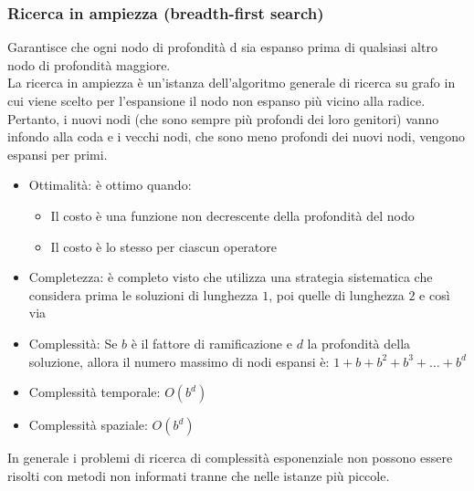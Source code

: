 \documentclass[../main.tex]{subfiles}
\begin{document}
	\subsubsection{Ricerca in ampiezza (breadth-first search)}
	Garantisce che ogni nodo di profondità d sia espanso prima di qualsiasi altro nodo di profondità maggiore.\\
	La ricerca in ampiezza è un'istanza dell'algoritmo generale di ricerca su grafo in cui viene scelto per l'espansione il nodo non espanso più vicino alla radice. \\
	Pertanto, i nuovi nodi (che sono sempre più profondi dei loro genitori) vanno infondo alla coda e i vecchi nodi, che sono meno profondi dei nuovi nodi, vengono espansi per primi.
	\begin{itemize}
		\item Ottimalità: è ottimo quando: 
		\begin{itemize}
			\item Il costo è una funzione non decrescente della profondità del nodo
	 		\item Il costo è lo stesso per ciascun operatore
		\end{itemize}
		\item Completezza: è completo visto che utilizza una strategia sistematica che considera prima le soluzioni di lunghezza $1$, poi quelle di lunghezza $2$ e così via
		\item Complessità: Se $b$ è il fattore di ramificazione e $d$ la profondità della soluzione, allora il numero massimo di nodi espansi è: $1+b+b^2+b^3+…+b^d$
		\item Complessità temporale: $O(b^d)$
		\item Complessità spaziale: $O(b^d)$
	\end{itemize}
	In generale i problemi di ricerca di complessità esponenziale non possono essere risolti con metodi non informati tranne che nelle istanze più piccole.
\end{document}
